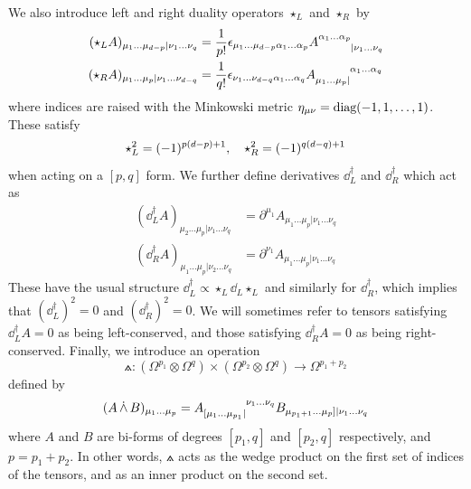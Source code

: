We also introduce left and right duality operators $\star_L$ and $\star_R$ by
\begin{align}
    (\star_L A)_{\mu_1\dots\mu_{d-p}|\nu_1\dots\nu_q} &= \frac{1}{p!} \epsilon_{\mu_1\dots\mu_{d-p}\alpha_1\dots\alpha_p} A\indices{^{\alpha_1\dots\alpha_p}_{|\nu_1\dots\nu_q}} \\
    (\star_R A)_{\mu_1\dots\mu_p|\nu_1\dots\nu_{d-q}} &= \frac{1}{q!} \epsilon_{\nu_1\dots\nu_{d-q}\alpha_1\dots\alpha_q} A\indices{_{\mu_1\dots\mu_p|}^{\alpha_1\dots\alpha_q}}
\end{align}
where indices are raised with the Minkowski metric $\eta_{\mu\nu} = \text{diag}(-1,1,\dots,1)$. These satisfy
\begin{equation}
    \star_L^2 = (-1)^{p(d-p)+1} \qc \star_R^2 = (-1)^{q(d-q)+1} 
\end{equation}
when acting on a $[p,q]$ form.
We further define  derivatives $\dd_L^\dag$ and $\dd_R^\dag$ which act as
\begin{align}
    (\dd_L^\dag A)_{\mu_2\dots\mu_p|\nu_1\dots\nu_q} &= \partial^{\mu_1} A_{\mu_1\dots\mu_p|\nu_1\dots\nu_q} \\
    (\dd_R^\dag A)_{\mu_1\dots\mu_p|\nu_2\dots\nu_q} &= \partial^{\nu_1} A_{\mu_1\dots\mu_p|\nu_1\dots\nu_q}
\end{align}
These have the usual structure $\dd^\dag_L \propto \star_L \dd_L \star_L$ and similarly for $\dd^\dag_R$, which implies that $(\dd^\dag_L)^2=0$ and $(\dd^\dag_R)^2=0$.
We will sometimes refer to tensors satisfying $\dd_L^\dag A=0$ as being left-conserved, and those satisfying $\dd_R^\dag A=0$ as being right-conserved.
Finally, we introduce an operation 
\begin{equation}
    \wedgedot: (\Omega^{p_1} \otimes \Omega^q )\times (\Omega^{p_2} \otimes\Omega^q ) \to \Omega^{p_1+p_2}
\end{equation}
defined by
\begin{equation}\label{eq:wedgedot}
    (A \,\wedgedot\, B)_{\mu_1\dots\mu_p} = A\indices{_{[\mu_1\dots\mu_{p_1}|}^{\nu_1\dots\nu_q}} B_{\mu_{p_1+1} \dots \mu_p]|\nu_1\dots\nu_q}
\end{equation}
where $A$ and $B$ are bi-forms of degrees $[p_1,q]$ and $[p_2,q]$ respectively, and $p = p_1+p_2$. In other words, $\wedgedot$ acts as the wedge product on the first set of indices of the tensors, and as an inner product on the second set. 